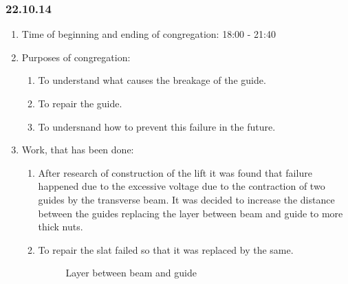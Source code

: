 
\subsubsection{22.10.14}

\begin{enumerate}
	\item Time of beginning and ending of congregation:
	18:00 - 21:40
	\item Purposes of congregation:
	\begin{enumerate}
	  \item To understand what causes the breakage of the guide.
	  
	  \item To repair the guide.
	  
	  \item To undersnand how to prevent this failure in the future.
	  
    \end{enumerate}
    
	\item Work, that has been done:
	\begin{enumerate}
	  \item After research of construction of the lift it was found that failure happened due to the excessive voltage due to the contraction of two guides by the transverse beam. It was decided to increase the distance between the guides replacing the layer between beam and guide to more thick nuts.
      
      \item To repair the slat failed so that it was replaced by the same.
      
      \begin{figure}[H]
      	\begin{minipage}[h]{1\linewidth}
      		\caption{Layer between beam and guide}
      	\end{minipage}
      \end{figure}
      

\end{enumerate}
\end{enumerate}
